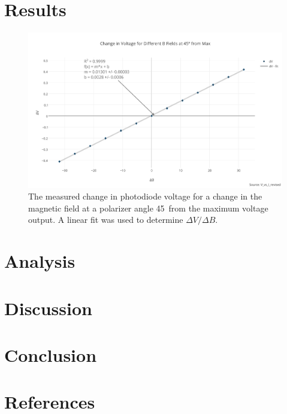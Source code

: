 \documentclass[prb,preprint]{revtex4-1}
\begin{document}
\section{Results}
\begin{figure}
\includegraphics[width =6.5in]{change_in_voltage_for_different_b_fields_at_45_from_max.pdf}
\caption{\label{method2pic} The measured change in photodiode voltage for a change in the magnetic field at a polarizer angle 45\degree\  from the maximum voltage output. A linear fit was used to determine $\Delta V/\Delta B$.}
\end{figure}
\section{Analysis}


\section{Discussion}




\section{Conclusion}


\section{References}
\end{document}
